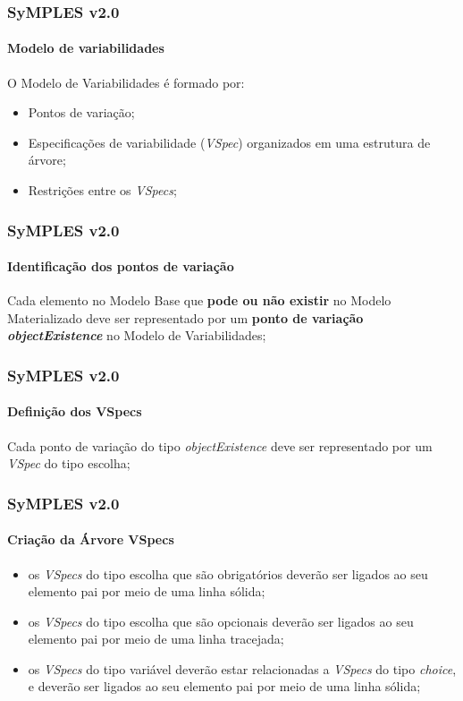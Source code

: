 \begin{frame}
\frametitle{SyMPLES v2.0}
\framesubtitle{Modelo de variabilidades}

  O Modelo de Variabilidades é formado por:
  
  \begin{itemize}
    \item {
      Pontos de variação;
    }
    \item {
      Especificações de variabilidade (\textit{VSpec}) organizados em uma estrutura de árvore;
    }
    \item {
      Restrições entre os \textit{VSpecs};
    }
  \end{itemize}

\end{frame}

\begin{frame}
\frametitle{SyMPLES v2.0}
\framesubtitle{Identificação dos pontos de variação}

  Cada elemento no Modelo Base que \textbf{pode ou não existir} no Modelo Materializado deve ser representado por um \textbf{ponto de variação \textit{objectExistence}} no Modelo de Variabilidades;

\end{frame}

\begin{frame}
\frametitle{SyMPLES v2.0}
\framesubtitle{Definição dos VSpecs}

  Cada ponto de variação do tipo \textit{objectExistence} deve ser representado por um \textit{VSpec} do tipo escolha;

\end{frame}

\begin{frame}
\frametitle{SyMPLES v2.0}
\framesubtitle{Criação da Árvore VSpecs}

  \begin{itemize}
    \item {
      os \textit{VSpecs} do tipo escolha que são obrigatórios deverão ser ligados ao seu elemento pai por meio de uma linha sólida;
    }
    \item {
      os \textit{VSpecs} do tipo escolha que são opcionais deverão ser ligados ao seu elemento pai por meio de uma linha tracejada;
    }
    \item {
      os \textit{VSpecs} do tipo variável deverão estar relacionadas a \textit{VSpecs} do tipo \textit{choice}, e deverão ser ligados ao seu elemento pai por meio de uma linha sólida;
    }
  \end{itemize}
  
\end{frame}

